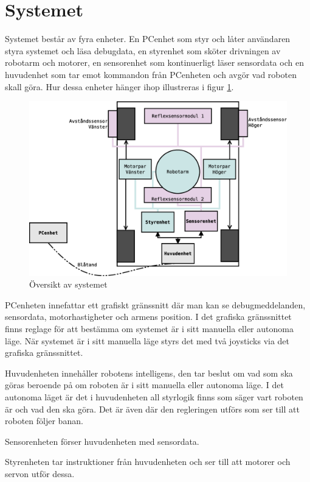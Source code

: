 
\section{Systemet}
Systemet består av fyra enheter. En PCenhet som styr och låter användaren styra systemet och läsa debugdata, en styrenhet som sköter drivningen av robotarm och motorer, en sensorenhet som kontinuerligt läser sensordata och en huvudenhet som tar emot kommandon från PCenheten och avgör vad roboten skall göra. Hur dessa enheter hänger ihop illustreras i figur \ref{system-oversikt}.

\begin{figure}[h!]
	\centering
	\includegraphics[scale=0.4]{grafik/system-oversikt}
	\caption{Översikt av systemet} \label{system-oversikt}
\end{figure}

PCenheten innefattar ett grafiskt gränssnitt där man kan se debugmeddelanden, sensordata, motorhastigheter och armens position. I det grafiska gränssnittet finns reglage för att bestämma om systemet är i sitt manuella eller autonoma läge. När systemet är i sitt manuella läge styrs det med två joysticks via det grafiska gränssnittet.

Huvudenheten innehåller robotens intelligens, den tar beslut om vad som ska göras beroende på om roboten är i sitt manuella eller autonoma läge. I det autonoma läget är det i huvudenheten all styrlogik finns som säger vart roboten är och vad den ska göra. Det är även där den regleringen utförs som ser till att roboten följer banan.

Sensorenheten förser huvudenheten med sensordata.

Styrenheten tar instruktioner från huvudenheten och ser till att motorer och servon utför dessa.
